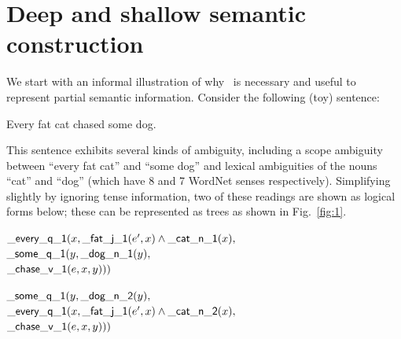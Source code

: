 \section{Deep and shallow semantic construction}
\label{sec:motivation}

We start with an informal illustration of why \rmrs\ is necessary and
useful to represent partial semantic information.  Consider the
following (toy) sentence:

\begin{examples}
  \item Every fat cat chased some dog.
\end{examples}

This sentence exhibits several kinds of ambiguity, including a scope
ambiguity between ``every fat cat'' and ``some dog'' and lexical
ambiguities of the nouns ``cat'' and ``dog'' (which have 8 and 7
WordNet senses respectively).  Simplifying slightly by ignoring tense
information, two of these readings are shown as logical forms below;
these can be represented as trees as shown in Fig.~\ref{fig:1}.

\begin{examples}
\item $\mathsf{\_every\_q\_1}(x, \mathsf{\_fat\_j\_1}(e',x) \wedge
    \mathsf{\_cat\_n\_1}(x),$\\
\hspace*{0.1in} $\mathsf{\_some\_q\_1}(y, \mathsf{\_dog\_n\_1}(y),$\\
\hspace*{0.2in}$\mathsf{\_chase\_v\_1}(e,x,y)))$
\label{ex:fat-cat-1}
\item $\mathsf{\_some\_q\_1}(y, \mathsf{\_dog\_n\_2}(y),$\\
\hspace*{0.1in}$\mathsf{\_every\_q\_1}(x, \mathsf{\_fat\_j\_1}(e',x) \wedge
    \mathsf{\_cat\_n\_2}(x), $\\
\hspace*{0.2in}$\mathsf{\_chase\_v\_1}(e,x,y)))$
\label{ex:fat-cat-2}
\end{examples}


